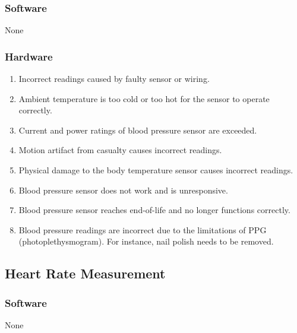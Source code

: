 \documentclass{article}
\begin{document}
        \subsubsection{Software}
        \noindent
        None
        \subsubsection{Hardware}
        \begin{enumerate}[label = (\alph*)]
            \item Incorrect readings caused by faulty sensor or wiring.
            \item Ambient temperature is too cold or too hot for the sensor to operate correctly.
            \item Current and power ratings of blood pressure sensor are exceeded.
            \item Motion artifact from casualty causes incorrect readings.
            \item Physical damage to the body temperature sensor causes incorrect readings.
            \item Blood pressure sensor does not work and is unresponsive.
            \item Blood pressure sensor reaches end-of-life and no longer functions correctly.
            \item Blood pressure readings are incorrect due to the limitations of PPG (photoplethysmogram).  For instance, nail polish needs to be removed.  
        \end{enumerate}
    
    \subsection{Heart Rate Measurement}
        \subsubsection{Software}
        \noindent
        None
\end{document}
